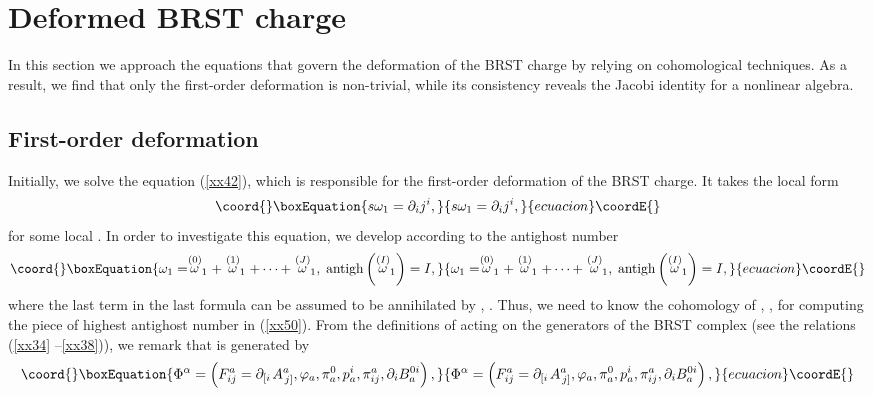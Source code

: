 \documentclass[a4paper,12pt]{article}
\begin{document}
\section{Deformed BRST charge}

In this section we approach the equations that govern the deformation of the
BRST charge by relying on cohomological techniques. As a result, we find
that only the first-order deformation is non-trivial, while its consistency
reveals the Jacobi identity for a nonlinear algebra.

\subsection{First-order deformation}

Initially, we solve the equation (\ref{xx42}), which is responsible for the
first-order deformation of the BRST charge. It takes the local form 
\begin{equation}\coord{}\boxEquation{
s\omega _{1}=\partial _{i}j^{i},  \label{xx49}
}{
s\omega _{1}=\partial _{i}j^{i},  }{ecuacion}\coordE{}\end{equation}
for some local \coordHE{}. In order to investigate this equation, we develop \coordHE{} according to the antighost number 
\begin{equation}\coord{}\boxEquation{
\omega _{1}=\stackrel{(0)}{\omega }_{1}+\stackrel{(1)}{\omega }_{1}+\cdots +
\stackrel{(J)}{\omega }_{1},\;\mathrm{antigh}\left( \stackrel{(I)}{\omega }
_{1}\right) =I,  \label{xx50}
}{
\omega _{1}=\stackrel{(0)}{\omega }_{1}+\stackrel{(1)}{\omega }_{1}+\cdots +
\stackrel{(J)}{\omega }_{1},\;\mathrm{antigh}\left( \stackrel{(I)}{\omega }
_{1}\right) =I,  }{ecuacion}\coordE{}\end{equation}
where the last term in the last formula can be assumed to be annihilated by \myHighlight{$%
\gamma $}\coordHE{}, \coordHE{}. Thus, we need to know the
cohomology of \myHighlight{$\gamma $}\coordHE{}, \coordHE{}, for computing the piece
of highest antighost number in (\ref{xx50}). From the definitions of \myHighlight{$\gamma 
$}\coordHE{} acting on the generators of the BRST complex (see the relations (\ref{xx34}%
--\ref{xx38})), we remark that \coordHE{} is generated by 
\begin{equation}\coord{}\boxEquation{
\Phi ^{\alpha }=\left( F_{ij}^{a}=\partial _{\left[ i\right. }A_{\left.
j\right] }^{a},\varphi _{a},\pi _{a}^{0},p_{a}^{i},\pi _{ij}^{a},\partial
_{i}B_{a}^{0i}\right) ,  \label{xx51}
}{
\Phi ^{\alpha }=\left( F_{ij}^{a}=\partial _{\left[ i\right. }A_{\left.
j\right] }^{a},\varphi _{a},\pi _{a}^{0},p_{a}^{i},\pi _{ij}^{a},\partial
_{i}B_{a}^{0i}\right) ,  }{ecuacion}\coordE{}\end{equation}
\end{document}
